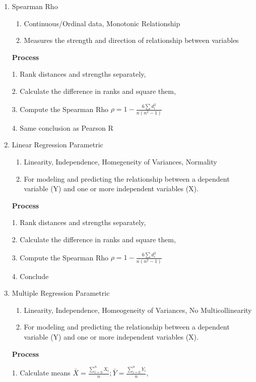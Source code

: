 \documentclass[4pt]{article}
\begin{document}
\begin{multicols*}{2}
\begin{enumerate}
        \item Spearman Rho
        \begin{enumerate}
            \item Continuous/Ordinal data, Monotonic Relationship
            \item Measures the strength and direction of relationship between variables
        \end{enumerate}
        \textbf{Process}
            
        1. Rank distances and strengths separately, 
    
        2. Calculate the difference in ranks and square them,

        3. Compute the Spearman Rho $ \rho = 1 - \frac{6\sum{d_i^2}}{n(n^2-1)}$
    
        4. Same conclusion as Pearson R

        \item Linear Regression {Parametric}
        \begin{enumerate}
            \item Linearity, Independence, Homegeneity of Variances, Normality
            \item For modeling and predicting the relationship between a dependent variable 
            (Y) and one or more independent variables (X).
        \end{enumerate}
        \textbf{Process}
            
        1. Rank distances and strengths separately, 
    
        2. Calculate the difference in ranks and square them,

        3. Compute the Spearman Rho $ \rho = 1 - \frac{6\sum{d_i^2}}{n(n^2-1)}$
    
        4. Conclude

        \item Multiple Regression {Parametric}
        \begin{enumerate}
            \item Linearity, Independence, Homeogeneity of Variances, No Multicollinearity
            \item For modeling and predicting the relationship between a dependent variable 
            (Y) and one or more independent variables (X).
        \end{enumerate}
        \textbf{Process}
            
        1. Calculate means $ \bar{X} = \frac{\sum_{i=0}^n{X_i}}{n};\bar{Y} = \frac{\sum_{i=0}^n{Y_i}}{n}$, 
    

\end{enumerate}
\end{multicols*}
\end{document}
